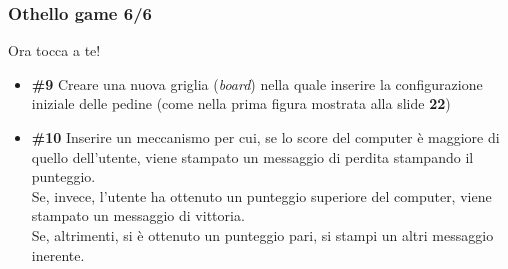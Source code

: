 \documentclass{beamer}
\begin{document}
\begin{frame}[fragile]
\frametitle{Othello game 6/6}
\begin{block}{Ora tocca a te!}
	\begin{itemize}
		\item \textbf{\#9} Creare una nuova griglia (\textit{board}) nella quale inserire la configurazione iniziale delle pedine (come nella prima figura mostrata alla slide \textbf{22})
		\item \textbf{\#10} Inserire un meccanismo per cui, se lo score del computer è maggiore di quello dell'utente, viene stampato un messaggio di perdita stampando il punteggio.\\
		Se, invece, l'utente ha ottenuto un punteggio superiore del computer, viene stampato un messaggio di vittoria.\\
		Se, altrimenti, si è ottenuto un punteggio pari, si stampi un altri messaggio inerente.
	\end{itemize}
\end{block}
\end{frame}
\end{document}
